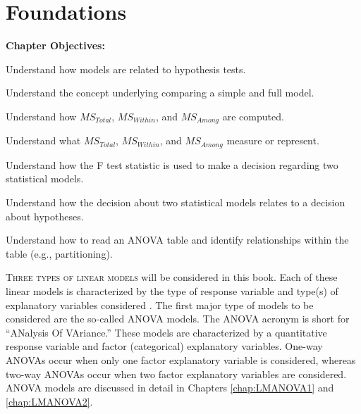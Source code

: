 \documentclass[10pt,openany]{book}\usepackage[]{graphicx}\usepackage[]{color}
\begin{document}
  \frontmatter
    

  \mainmatter



\chapter{Foundations}  \label{chap:LMFoundations}
  \begin{ChapObj}{\boxwidth}
     \textbf{Chapter Objectives:}
      \begin{Enumerate}
        \item Understand how models are related to hypothesis tests.
        \item Understand the concept underlying comparing a simple and full model.
        \item Understand how $MS_{Total}$, $MS_{Within}$, and $MS_{Among}$ are computed.
        \item Understand what $MS_{Total}$, $MS_{Within}$, and $MS_{Among}$ measure or represent.
        \item Understand how the F test statistic is used to make a decision regarding two statistical models.
        \item Understand how the decision about two statistical models relates to a decision about hypotheses.
        \item Understand how to read an ANOVA table and identify relationships within the table (e.g., partitioning).
      \end{Enumerate}
  \end{ChapObj}

\minitoc
\newpage

\lettrine{T}{hree types of linear models} will be considered in this book.  Each of these linear models is characterized by the type of response variable and type(s) of explanatory variables considered .  The first major type of models to be considered are the so-called ANOVA models.  The ANOVA acronym is short for ``ANalysis Of VAriance.''  These models are characterized by a quantitative response variable and factor (categorical) explanatory variables.  One-way ANOVAs occur when only one factor explanatory variable is considered, whereas two-way ANOVAs occur when two factor explanatory variables are considered.  ANOVA models are discussed in detail in Chapters \ref{chap:LMANOVA1} and \ref{chap:LMANOVA2}.
\end{document}
